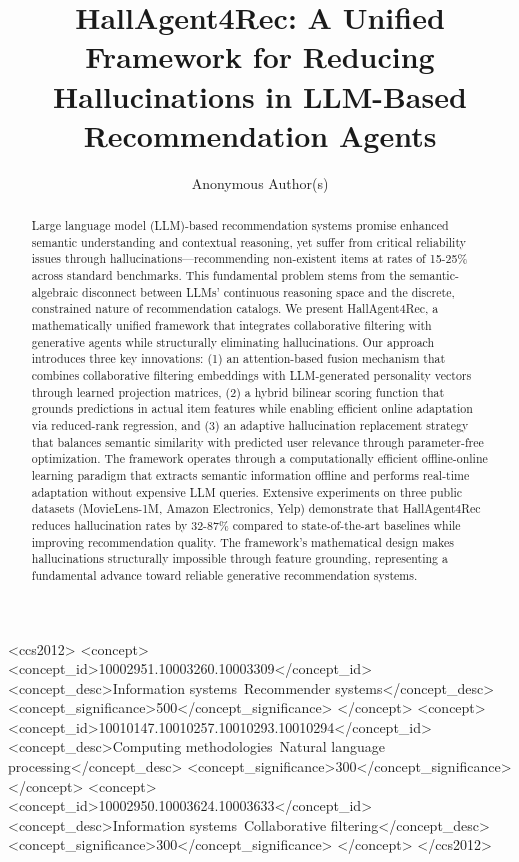 \documentclass[acmsmall]{acmart}
\title{HallAgent4Rec: A Unified Framework for Reducing Hallucinations in LLM-Based Recommendation Agents}
\author{Anonymous Author(s)}
\begin{document}
\begin{abstract}
Large language model (LLM)-based recommendation systems promise enhanced semantic understanding and contextual reasoning, yet suffer from critical reliability issues through hallucinations—recommending non-existent items at rates of 15-25\% across standard benchmarks. This fundamental problem stems from the semantic-algebraic disconnect between LLMs' continuous reasoning space and the discrete, constrained nature of recommendation catalogs. We present HallAgent4Rec, a mathematically unified framework that integrates collaborative filtering with generative agents while structurally eliminating hallucinations. Our approach introduces three key innovations: (1) an attention-based fusion mechanism that combines collaborative filtering embeddings with LLM-generated personality vectors through learned projection matrices, (2) a hybrid bilinear scoring function that grounds predictions in actual item features while enabling efficient online adaptation via reduced-rank regression, and (3) an adaptive hallucination replacement strategy that balances semantic similarity with predicted user relevance through parameter-free optimization. The framework operates through a computationally efficient offline-online learning paradigm that extracts semantic information offline and performs real-time adaptation without expensive LLM queries. Extensive experiments on three public datasets (MovieLens-1M, Amazon Electronics, Yelp) demonstrate that HallAgent4Rec reduces hallucination rates by 32-87\% compared to state-of-the-art baselines while improving recommendation quality. The framework's mathematical design makes hallucinations structurally impossible through feature grounding, representing a fundamental advance toward reliable generative recommendation systems.
\end{abstract}
\maketitle
\begin{CCSXML}
<ccs2012>
<concept>
<concept_id>10002951.10003260.10003309</concept_id>
<concept_desc>Information systems~Recommender systems</concept_desc>
<concept_significance>500</concept_significance>
</concept>
<concept>
<concept_id>10010147.10010257.10010293.10010294</concept_id>
<concept_desc>Computing methodologies~Natural language processing</concept_desc>
<concept_significance>300</concept_significance>
</concept>
<concept>
<concept_id>10002950.10003624.10003633</concept_id>
<concept_desc>Information systems~Collaborative filtering</concept_desc>
<concept_significance>300</concept_significance>
</concept>
</ccs2012>
\end{CCSXML}
\end{document}
